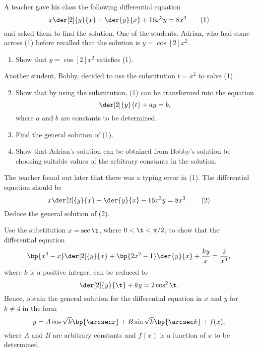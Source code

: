 \begin{problem}
    A teacher gave his class the following differential equation \[x\der[2]{y}{x} - \der{y}{x} + 16x^3 y = 8x^3 \tag{1}\] and asked them to find the solution. One of the students, Adrian, who had come across (1) before recalled that the solution is $y= \cos[2]{x^2}$.

    \begin{enumerate}
        \item Show that $y = \cos[2]{x^2}$ satisfies (1).
    \end{enumerate}

    Another student, Bobby, decided to use the substitution $t = x^2$ to solve (1).

    \begin{enumerate}
        \setcounter{enumi}{1}
        \item Show that by using the substitution, (1) can be transformed into the equation \[\der[2]{y}{t} + ay = b,\] where $a$ and $b$ are constants to be determined.
        \item Find the general solution of (1).
        \item Show that Adrian's solution can be obtained from Bobby's solution be choosing suitable values of the arbitrary constants in the solution.
    \end{enumerate}

    The teacher found out later that there was a typing error in (1). The differential equation should be \[x\der[2]{y}{x} - \der{y}{x} - 16x^3 y = 8x^3. \tag{2}\] Deduce the general solution of (2).
\end{problem}

\begin{problem}
    Use the substitution $x = \sec \t$, where $0 < \t < \pi/2$, to show that the differential equation \[\bp{x^3 - x} \der[2]{y}{x} + \bp{2x^2 - 1} \der{y}{x} + \frac{ky}{x} = \frac2{x^3},\] where $k$ is a positive integer, can be reduced to \[\der[2]{y}{\t} + ky = 2\cos^2 \t.\] Hence, obtain the general solution for the differential equation in $x$ and $y$ for $k \neq 4$ in the form \[y = A \cos \sqrt{k} \bp{\arcsec x} + B \sin \sqrt{k} \bp{\arcsec k} + f(x),\] where $A$ and $B$ are arbitrary constants and $f(x)$ is a function of $x$ to be determined.
\end{problem}

